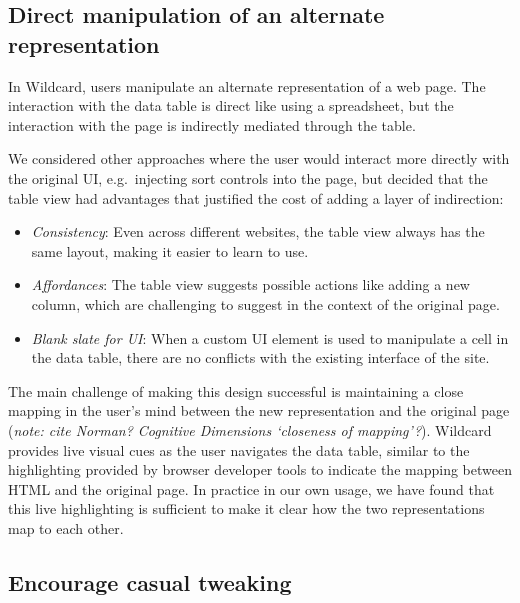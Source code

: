 \documentclass[english,submission]{programming}
\providecommand{\tightlist}{%
  \setlength{\itemsep}{0pt}\setlength{\parskip}{0pt}}
\begin{document}
\hypertarget{direct-manipulation-of-an-alternate-representation}{%
\subsection{Direct manipulation of an alternate
representation}\label{direct-manipulation-of-an-alternate-representation}}

In Wildcard, users manipulate an alternate representation of a web page.
The interaction with the data table is direct like using a spreadsheet,
but the interaction with the page is indirectly mediated through the
table.

We considered other approaches where the user would interact more
directly with the original UI, e.g.~injecting sort controls into the
page, but decided that the table view had advantages that justified the
cost of adding a layer of indirection:

\begin{itemize}
\tightlist
\item
  \emph{Consistency}: Even across different websites, the table view
  always has the same layout, making it easier to learn to use.
\item
  \emph{Affordances}: The table view suggests possible actions like
  adding a new column, which are challenging to suggest in the context
  of the original page.
\item
  \emph{Blank slate for UI}: When a custom UI element is used to
  manipulate a cell in the data table, there are no conflicts with the
  existing interface of the site.
\end{itemize}

The main challenge of making this design successful is maintaining a
close mapping in the user's mind between the new representation and the
original page (\emph{note: cite Norman? Cognitive Dimensions `closeness
of mapping'?}). Wildcard provides live visual cues as the user navigates
the data table, similar to the highlighting provided by browser
developer tools to indicate the mapping between HTML and the original
page. In practice in our own usage, we have found that this live
highlighting is sufficient to make it clear how the two representations
map to each other.

\hypertarget{encourage-casual-tweaking}{%
\subsection{Encourage casual tweaking}\label{encourage-casual-tweaking}}
\end{document}

